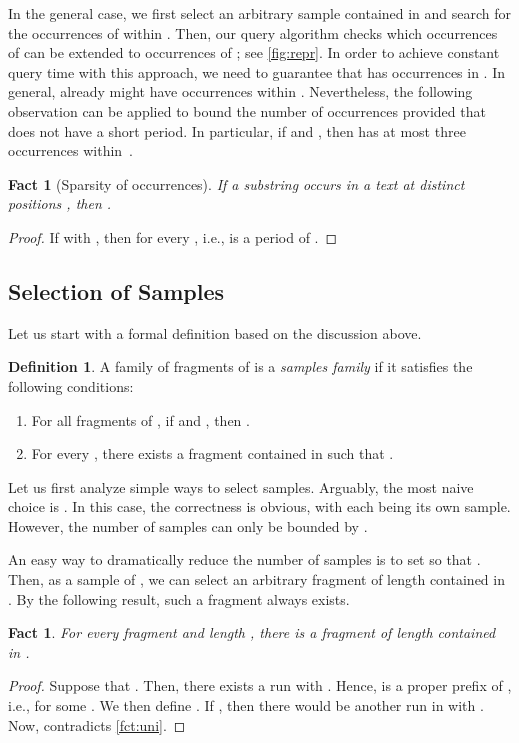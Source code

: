 \documentclass[a4paper]{article}
\newtheorem{fact}[theorem]{Fact}
\theoremstyle{definition}
\newtheorem{definition}[theorem]{Definition}
\theoremstyle{remark}
\begin{document}
In the general case, we first select an arbitrary sample  contained in 
and search for the occurrences of  within . 
Then, our query algorithm checks which occurrences of  can be extended to occurrences of ; see \cref{fig:repr}.
In order to achieve constant query time with this approach, we need to guarantee that  has   occurrences in . 
In general, already  might have  occurrences within .
Nevertheless, the following observation can be applied to bound the number of occurrences provided that  does not have a short period.
In particular, if  and , then  has at most three occurrences within~.

\begin{fact}[Sparsity of occurrences]\label{fct:far}
  If a substring  occurs in a text  at distinct positions , then .
  \end{fact}
  \begin{proof}
  If  with , then  for every , i.e.,  is a period of .
  \end{proof}



\subsection{Selection of Samples}\label{sec:repr}
Let us start with a formal definition based on the discussion above.
\begin{definition}\label{def:repr}
  A family  of fragments of  is a \emph{samples family} if it satisfies the following conditions:
  \begin{enumerate}[label=(\alph*)]
    \item\label{it:repr:cons} For all fragments  of , if  and , then .

\smallskip
    \item\label{it:repr:dens} For every , there exists a fragment  contained in  such that .
  \end{enumerate}
\end{definition}

Let us first analyze simple ways to select samples. 
Arguably, the most naive choice is .
In this case, the correctness is obvious, with each  being its own sample.
However, the number of samples can only be bounded by .

An easy way to dramatically reduce the number of samples is to set  so that . 
Then, as a sample of , we can select an arbitrary fragment 
of length  contained in . 
By the following result, such a fragment always exists.
\begin{fact}\label{fct:nonp}
  For every fragment  and length ,
  there is a fragment  of length  contained in .
  \end{fact}
  \begin{proof}
  Suppose that .
  Then, there exists a run  with . 
  Hence,  is a proper prefix of ,
  i.e.,  for some .
  We then define .
  If , then there would be another run  in  with .
  Now,  contradicts  \cref{fct:uni}.
  \end{proof}
\end{document}
